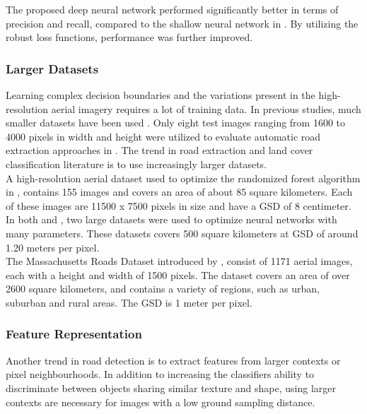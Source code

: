 The proposed deep neural network performed significantly better in terms of precision and recall, compared to the shallow neural network in \citep{Mnih_roads_high_res_aerial_images}. By utilizing the robust loss functions, performance was further improved.\\

\subsubsection{Larger Datasets}
Learning complex decision boundaries and the variations present in the high-resolution aerial imagery requires a lot of training data. In previous studies, much smaller datasets have been used \citep{Mokhtarzade_road_ann} \citep{Song_road_extraction_svm}. Only eight test images ranging from 1600 to 4000 pixels in width and height were utilized to evaluate automatic road extraction approaches in \citep{Mayer_road_test}. The trend in road extraction and land cover classification literature is to use increasingly larger datasets.\\

A high-resolution aerial dataset used to optimize the randomized forest algorithm in \citep{Kluckner_semantic_height}, contains  155 images and covers an area of about 85 square kilometers. Each of these images are 11500 x 7500 pixels in size and have a \ac{GSD} of 8 centimeter.\\

In both \citep{Mnih_roads_high_res_aerial_images} and \citep{Mnih_aerial_images_noisy}, two large datasets were used to optimize neural networks with many parameters. These datasets covers 500 square kilometers at \ac{GSD} of around 1.20 meters per pixel.\\

The Massachusetts Roads Dataset introduced by \cite{MnihThesis}, consist of 1171 aerial images, each with a height and width of 1500 pixels. The dataset covers an area of over 2600 square kilometers, and contains a variety of regions, such as urban, suburban and rural areas. The \ac{GSD} is 1 meter per pixel.\\


\subsubsection{Feature Representation}
Another trend in road detection is to extract features from larger contexts or pixel neighbourhoods. In addition to increasing the classifiers ability to discriminate between objects sharing similar texture and shape, using larger contexts are necessary for images with a low ground sampling distance.\\

